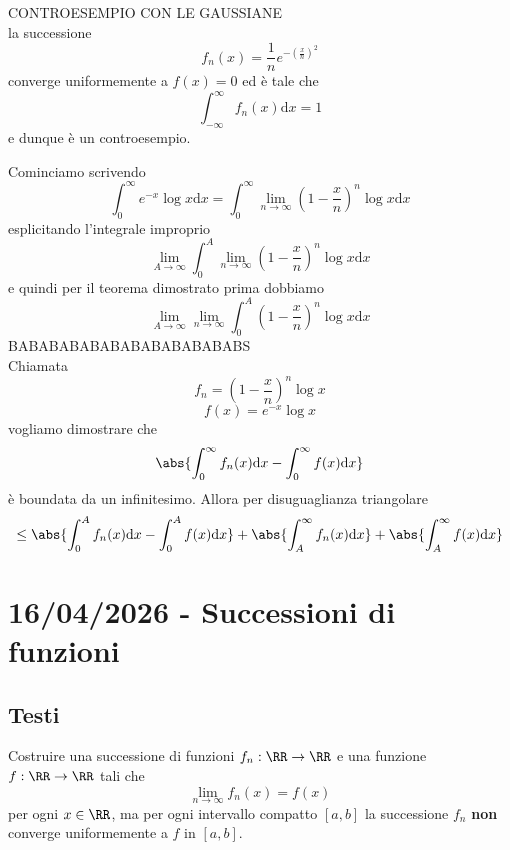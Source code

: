 \documentclass[11pt]{scrartcl}
\newcommand{\dif}{\text{d}}
\begin{document}
	\begin{answer}[Problema 4]
		CONTROESEMPIO CON LE GAUSSIANE \\
		la successione
		$$f_n(x)=\frac{1}{n}e^{-\left(\frac{x}{n}\right)^2}$$
		converge uniformemente a $f(x)=0$ ed è tale che
		$$\int_{-\infty}^{\infty}f_n(x)\dif x=1$$
		e dunque è un controesempio.
	\end{answer}
	\begin{answer}[Problema 5]
		Cominciamo scrivendo 
		$$\int_0^\infty e^{-x}\log x\dif x=\int_0^\infty \lim_{n\to\infty} \left(1-\frac{x}{n}\right)^n\log x \dif x$$
		esplicitando l'integrale improprio
		$$\lim_{A\to\infty}\int_0^A \lim_{n\to\infty} \left(1-\frac{x}{n}\right)^n\log x \dif x$$
		e quindi per il teorema dimostrato prima dobbiamo 
		$$\lim_{A\to\infty}\lim_{n\to\infty}\int_0^A \left(1-\frac{x}{n}\right)^n \log x \dif x$$
		BABABABABABABABABABABABS
		\\
		
		Chiamata 
		$$f_n=\left(1-\frac{x}{n}\right)^n\log x$$
		$$f(x)=e^{-x}\log x$$
		vogliamo dimostrare che
		$$\abs{\int_0^\infty f_n(x)\dif x-\int_0^\infty f(x)\dif x}$$
		è boundata da un infinitesimo. Allora per disuguaglianza triangolare
		$$\le \abs{\int_0^A f_n(x)\dif x-\int_0^A f(x)\dif x}+\abs{\int_A^\infty f_n(x)\dif x}+\abs{\int_A^\infty f(x)\dif x}$$
	\end{answer}
	
	\newpage
	
	\section{16/04/2026 - Successioni di funzioni}
	
	\subsection{Testi}
	
	\begin{problem}[Problema 1]
		Costruire una successione di funzioni $f_n:\RR\to\RR$ e una funzione $f:\RR\to\RR$ tali che
		$$\lim_{n\to\infty}f_n(x)=f(x)$$
		per ogni $x\in\RR$, ma per ogni intervallo compatto $[a,b]$ la successione $f_n$ \textbf{non} converge uniformemente a $f$ in $[a,b]$.
	\end{problem}
	
\end{document}
